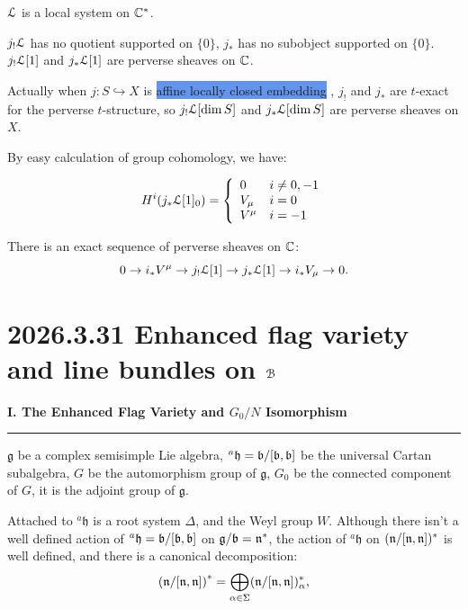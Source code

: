 \documentclass[12pt]{amsart}
\numberwithin{equation}{section}
\newcommand{\fg}{\mathfrak{g}} \newcommand{\fh}{\mathfrak{h}} \newcommand{\fk}{\mathfrak{k}}
\begin{document}
${\mathcal {L}}$ is a local system on ${\mathbb {C}}^*$. 

$j_!{\mathcal {L}}$ has no quotient supported on $\{0\}$, $j_*$ has no subobject supported on $\{0\}$. $j_!{\mathcal {L}}[1]$ and $j_*{\mathcal {L}}[1]$ are perverse sheaves on ${\mathbb {C}}$.


\begin{rk}
  Actually when $j: S \hookrightarrow  X$ is \colorbox{CornflowerBlue}{affine locally closed embedding} , $j_!$ and $j_*$ are $t$-exact for the perverse $t$-structure, so $j_!{\mathcal {L}}[\dim S]$ and $j_*{\mathcal {L}}[\dim S]$ are perverse sheaves on $X$.
\end{rk}
  



  



By easy calculation of group cohomology, we have:

\begin{align*}
  H^i(j_*{\mathcal {L}}[1]_0) = \left\{
  \begin{array}{ll}
    0 & i \neq 0,-1 \\
    V_{\mu} & i = 0 \\
    V^{\mu} & i = -1
  \end{array}
  \right. 
\end{align*}

There is an exact sequence of perverse sheaves on ${\mathbb {C}}$:
\[0 \to i_*V^{\mu} \to j_!{\mathcal {L}}[1] \to j_*{\mathcal {L}}[1] \to i_*V_{\mu} \to 0.\]






\section{2026.3.31 Enhanced flag variety and line bundles on ${\mathcal {B}}$}
\noindent\textbf{\large I. The Enhanced Flag Variety and $G_0/N$ Isomorphism \cite{BB93}} 
\vspace{2mm}
\hrule 
\vspace{3mm}

$\fg$ be a complex semisimple Lie algebra, ${^{a}\fh} = \fb/[\fb,\fb]$ be the universal Cartan subalgebra, $G$ be the automorphism group of $\fg$, $G_0$ be the connected component of $G$, it is the adjoint group of $\fg$.

Attached to ${^{a}\fh}$ is a root system $\Delta$, and the Weyl group $W$. Although there isn't a well defined action of ${^{a}\fh} = \fb/[\fb,\fb]$ on $\fg/\fb = \fn^*$, the action of ${^{a}\fh}$ on $(\mathfrak{n}/[\mathfrak{n},\mathfrak{n}])^*$ is well defined, and there is a canonical decomposition:
\[
  \left(\mathfrak{n}/[\mathfrak{n},\mathfrak{n}]\right)^* = \bigoplus_{\alpha \in \Sigma} (\mathfrak{n}/[\mathfrak{n},\mathfrak{n}])^*_{\alpha},
\]
\end{document}
